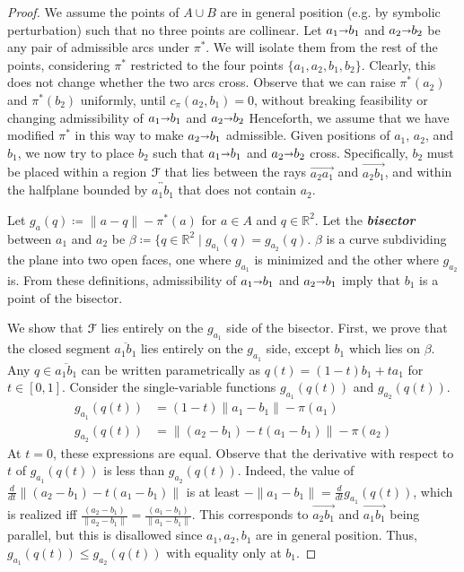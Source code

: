 \documentclass[a4paper,UKenglish]{socg-lipics-v2018}
\def\reals{\mathbb{R}}
\def\norm#1{\mathopen\| #1 \mathclose\|}	%
\def\arcto{\mathord\shortrightarrow}
\def\arc#1#2{#1\arcto#2}
\theoremstyle{plain}
\numberwithin{figure}{section}
\def\EMPH#1{\textbf{\emph{\boldmath #1}}}
\begin{document}
\begin{proof}
We assume the points of $A \cup B$ are in general position (e.g. by symbolic
perturbation) such that no three points are collinear.
Let $\arc{a_1}{b_1}$ and $\arc{a_2}{b_2}$ be any pair of admissible arcs under
$\pi^*$.
We will isolate them from the rest of the points, considering $\pi^*$
restricted to the four points $\{a_1, a_2, b_1, b_2\}$.
Clearly, this does not change whether the two arcs cross.
Observe that we can raise $\pi^*(a_2)$ and $\pi^*(b_2)$ uniformly, until
$c_\pi(a_2, b_1) = 0$, without breaking feasibility or changing admissibility
of $\arc{a_1}{b_1}$ and $\arc{a_2}{b_2}$
Henceforth, we assume that we have modified $\pi^*$ in this way to make
$\arc{a_2}{b_1}$ admissible.
Given positions of $a_1$, $a_2$, and $b_1$, we now try to place $b_2$ such that
$\arc{a_1}{b_1}$ and $\arc{a_2}{b_2}$ cross.
Specifically, $b_2$ must be placed within a region $\EuScript{F}$ that lies
between the rays $\overrightarrow{a_2 a_1}$ and $\overrightarrow{a_2 b_1}$,
and within the halfplane bounded by $\overleftrightarrow{a_1 b_1}$ that does
not contain $a_2$.

Let $g_a(q) \coloneqq \norm{a-q} - \pi^*(a)$ for $a \in A$ and
$q \in \reals^2$.
Let the \EMPH{bisector} between $a_1$ and $a_2$ be
$\beta \coloneqq \{q \in \reals^2 \mid g_{a_1}(q) = g_{a_2}(q)$.
$\beta$ is a curve subdividing the plane into two open faces, one where
$g_{a_1}$ is minimized and the other where $g_{a_2}$ is.
From these definitions, admissibility of $\arc{a_1}{b_1}$ and $\arc{a_2}{b_1}$
imply that $b_1$ is a point of the bisector.

We show that $\EuScript{F}$ lies entirely on the $g_{a_1}$ side of the
bisector.
First, we prove that the closed segment $\overline{a_1 b_1}$ lies entirely on
the $g_{a_1}$ side, except $b_1$ which lies on $\beta$.
Any $q \in \overline{a_1 b_1}$ can be written parametrically as
$q(t) = (1-t) b_1 + t a_1$ for $t \in [0,1]$.
Consider the single-variable functions $g_{a_1}(q(t))$ and $g_{a_2}(q(t))$.
\begin{equation*}
\begin{aligned}
	g_{a_1}(q(t)) &= (1-t)\norm{a_1 - b_1} - \pi(a_1) \\
	g_{a_2}(q(t)) &= \norm{(a_2 - b_1) - t(a_1 - b_1)} - \pi(a_2)
\end{aligned}
\end{equation*}
At $t=0$, these expressions are equal.
Observe that the derivative with respect to $t$ of $g_{a_1}(q(t))$ is less than
$g_{a_2}(q(t))$.
Indeed, the value of $\frac{d}{dt}\norm{(a_2 - b_1) - t(a_1 - b_1)}$ is at
least $-\norm{a_1 - b_1} = \frac{d}{dt}g_{a_1}(q(t))$, which is realized iff
$\frac{(a_2 - b_1)}{\norm{a_2 - b_1}} = \frac{(a_1 - b_1)}{\norm{a_1 - b_1}}$.
This corresponds to $\overrightarrow{a_2 b_1}$ and $\overrightarrow{a_1 b_1}$
being parallel, but this is disallowed since $a_1, a_2, b_1$ are in general
position.
Thus, $g_{a_1}(q(t)) \leq g_{a_2}(q(t))$ with equality only at $b_1$.


\end{proof}
\end{document}
